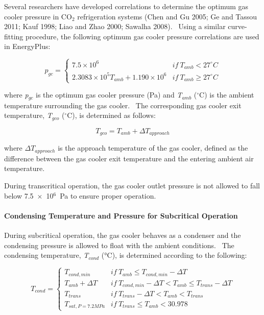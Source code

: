 Several researchers have developed correlations to determine the optimum gas cooler pressure in CO\(_{2}\) refrigeration systems (Chen and Gu 2005; Ge and Tassou 2011; Kauf 1998; Liao and Zhao 2000; Sawalha 2008).~ Using a similar curve-fitting procedure, the following optimum gas cooler pressure correlations are used in EnergyPlus:

\begin{equation}
  p_{gc} = \left\{
             \begin{array}{cl}
               7.5 \times 10^6                                & if~T_{amb} <    27^{\circ}C \\
               2.3083 \times 10^5 T_{amb} + 1.190 \times 10^6 & if~T_{amb} \geq 27^{\circ}C
             \end{array}
           \right.
\end{equation}

where \emph{p\(_{gc}\)} is the optimum gas cooler pressure (Pa) and \emph{T\(_{amb}\)} (\(^{\circ}\)C) is the ambient temperature surrounding the gas cooler.~ The corresponding gas cooler exit temperature, \emph{T\(_{gco}\)} (\(^{\circ}\)C), is determined as follows:

\begin{equation}
{T_{gco}} = {T_{amb}} + \Delta {T_{approach}}
\end{equation}

where \(\Delta T_{approach}\) is the approach temperature of the gas cooler, defined as the difference between the gas cooler exit temperature and the entering ambient air temperature.

During transcritical operation, the gas cooler outlet pressure is not allowed to fall below 7.5~×~10\(^{6}\)~Pa to ensure proper operation.

\paragraph{Condensing Temperature and Pressure for Subcritical Operation}\label{condensing-temperature-and-pressure-for-subcritical-operation}

During subcritical operation, the gas cooler behaves as a condenser and the condensing pressure is allowed to float with the ambient conditions.~ The condensing temperature, \emph{T\(_{cond}\)} (°C), is determined according to the following:

\begin{equation}
  T_{cond} = \left\{
               \begin{array}{cl}
                 T_{cond,min}                           & if~T_{amb} \le T_{cond,min} - \Delta T \\
                 T_{amb} + \Delta T                     & if~T_{cond,min} - \Delta T < T_{amb} \le T_{trans} - \Delta T \\
                 T_{trans}                              & if~T_{trans} - \Delta T < T_{amb} < T_{trans} \\
                 T_{sat,P = 7.2MPa}                     & if~T_{trans} \le {T_{amb}} < 30.978 
               \end{array}
             \right.
\end{equation}

